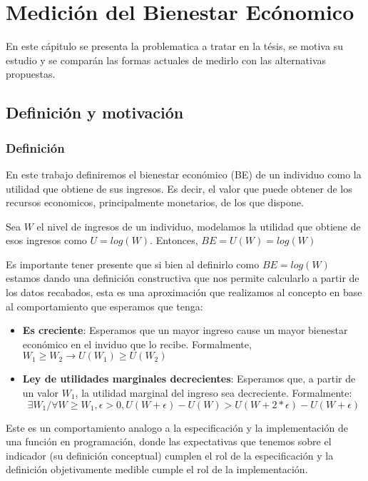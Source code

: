 \chapter{Medición del Bienestar Ecónomico}

En este cápitulo se presenta la problematica a tratar en la tésis, se motiva su estudio y se comparán las formas actuales de medirlo con las alternativas propuestas.

\section{Definición y motivación}

\subsection{Definición}

En este trabajo definiremos el bienestar económico (BE) de un individuo como la utilidad que obtiene de sus ingresos. Es decir, el valor que puede obtener de los recursos economicos, principalmente monetarios, de los que dispone.

Sea $W$ el nivel de ingresos de un individuo, modelamos la utilidad que obtiene de esos ingresos como $U = log(W)$. Entonces, $BE = U(W) = log(W)$

Es importante tener presente que si bien al definirlo como $BE = log(W)$ estamos dando una definición constructiva que nos permite calcularlo a partir de los datos recabados, esta es una aproximación que realizamos al concepto en base al comportamiento que esperamos que tenga:

\begin{itemize}
    \item \textbf{Es creciente}: Esperamos que un mayor ingreso cause un mayor bienestar económico en el inviduo que lo recibe. Formalmente, $W_1 \geq W_2 \rightarrow U(W_1) \geq U(W_2)$
    \item \textbf{Ley de utilidades marginales decrecientes}: Esperamos que, a partir de un valor $W_1$, la utilidad marginal del ingreso sea decreciente. Formalmente:
    $$
    \exists W_1 / \forall W \geq W_1, \epsilon > 0, U(W+\epsilon)-U(W) > U(W+2*\epsilon)-U(W+\epsilon)
    $$
\end{itemize}

Este es un comportamiento analogo a la especificación y la implementación de una función en programación, donde las expectativas que tenemos sobre el indicador (su definición conceptual) cumplen el rol de la especificación y la definición objetivamente medible cumple el rol de la implementación.

